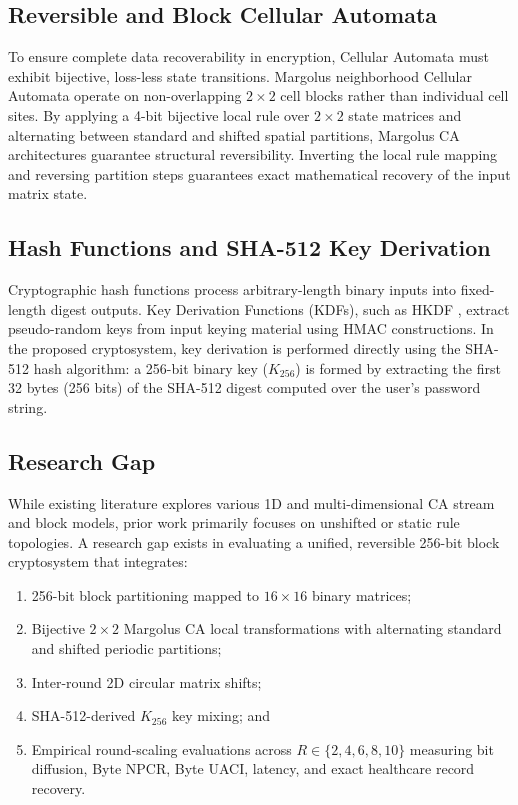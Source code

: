 \subsection{Reversible and Block Cellular Automata}
\label{subsec:reversible_ca}
To ensure complete data recoverability in encryption, Cellular Automata must exhibit bijective, loss-less state transitions. Margolus neighborhood Cellular Automata operate on non-overlapping $2 \times 2$ cell blocks rather than individual cell sites. By applying a 4-bit bijective local rule over $2 \times 2$ state matrices and alternating between standard and shifted spatial partitions, Margolus CA architectures guarantee structural reversibility. Inverting the local rule mapping and reversing partition steps guarantees exact mathematical recovery of the input matrix state.

\subsection{Hash Functions and SHA-512 Key Derivation}
\label{subsec:sha512_kdf}
Cryptographic hash functions process arbitrary-length binary inputs into fixed-length digest outputs. Key Derivation Functions (KDFs), such as HKDF \cite{rfc5869, nist2020sp80056c}, extract pseudo-random keys from input keying material using HMAC constructions. In the proposed cryptosystem, key derivation is performed directly using the SHA-512 hash algorithm: a 256-bit binary key ($K_{256}$) is formed by extracting the first 32 bytes (256 bits) of the SHA-512 digest computed over the user's password string.

\subsection{Research Gap}
\label{subsec:research_gap}
While existing literature explores various 1D and multi-dimensional CA stream and block models, prior work primarily focuses on unshifted or static rule topologies. A research gap exists in evaluating a unified, reversible 256-bit block cryptosystem that integrates:
\begin{enumerate}
    \item 256-bit block partitioning mapped to $16 \times 16$ binary matrices;
    \item Bijective $2 \times 2$ Margolus CA local transformations with alternating standard and shifted periodic partitions;
    \item Inter-round 2D circular matrix shifts;
    \item SHA-512-derived $K_{256}$ key mixing; and
    \item Empirical round-scaling evaluations across $R \in \{2, 4, 6, 8, 10\}$ measuring bit diffusion, Byte NPCR, Byte UACI, latency, and exact healthcare record recovery.
\end{enumerate}

